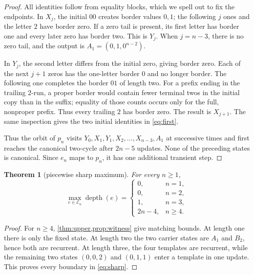 \documentclass[10pt,a4paper]{amsart}
\newtheorem{theorem}{Theorem}[section]
\theoremstyle{definition}
\theoremstyle{remark}
\newcommand{\En}{\mathcal E_n}
\newcommand{\depth}{\operatorname{depth}}
\begin{document}
\begin{proof}
All identities follow from equality blocks, which we spell out to fix the
endpoints.  In $X_j$, the initial $00$ creates border values $0,1$; the
following $j$ ones and the letter $2$ have border zero.  If a zero tail is
present, its first letter has border one and every later zero has border two.
This is $Y_j$.  When $j=n-3$, there is no zero tail, and the output is
$A_1=(0,1,0^{n-2})$.

In $Y_j$, the second letter differs from the initial zero, giving border
zero.  Each of the next $j+1$ zeros has the one-letter border $0$ and no
longer border.  The following one completes the border $01$ of length two.
For a prefix ending in the trailing $2$-run, a proper border would contain
fewer terminal twos in the initial copy than in the suffix; equality of those
counts occurs only for the full, nonproper prefix.  Thus every trailing $2$
has border zero.  The result is $X_{j+1}$.  The same inspection gives the two
initial identities in \eqref{eq:first}.

Thus the orbit of $p_n$ visits
$Y_0,X_1,Y_1,X_2,\ldots,X_{n-3},A_1$ at successive times and first reaches
the canonical two-cycle after $2n-5$ updates.  None of the preceding states
is canonical.  Since $e_n$ maps to $p_n$, it has one additional transient
step.
\end{proof}

\begin{theorem}[piecewise sharp maximum]\label{thm:sharp}
For every $n\ge1$,
\begin{equation}
 \max_{e\in\En}\depth(e)=
 \begin{cases}
 0,&n=1,\\
 0,&n=2,\\
 1,&n=3,\\
 2n-4,&n\ge4.
 \end{cases}                                           \label{eq:sharp}
\end{equation}
\end{theorem}

\begin{proof}
For $n\ge4$, \cref{thm:upper,prop:witness} give matching bounds.  At length
one there is only the fixed state.  At length two the two carrier states are
$A_1$ and $B_2$, hence both are recurrent.  At length three, the four
templates are recurrent, while the remaining two states $(0,0,2)$ and
$(0,1,1)$ enter a template in one update.  This proves every boundary in
\eqref{eq:sharp}.
\end{proof}
\end{document}
